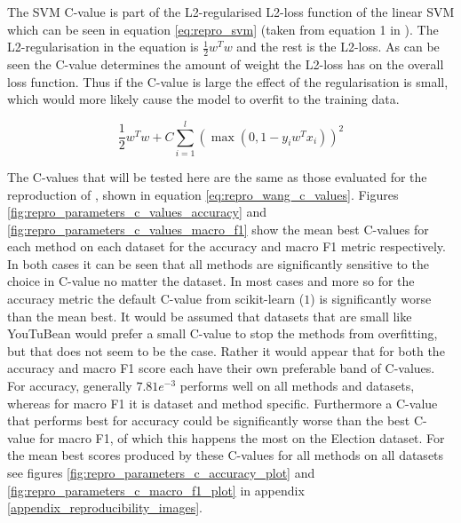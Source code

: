 The SVM C-value is part of the L2-regularised L2-loss function of the linear SVM which can be seen in equation \ref{eq:repro_svm} (taken from equation 1 in \citep{fan2008liblinear}). The L2-regularisation in the equation is $\frac{1}{2}w^Tw$ and the rest is the L2-loss. As can be seen the C-value determines the amount of weight the L2-loss has on the overall loss function. Thus if the C-value is large the effect of the regularisation is small, which would more likely cause the model to overfit to the training data.

\begin{equation}
    \frac{1}{2}w^{T}w + C\sum_{i=1}^{l}(\max(0, 1 - y_{i}w^{T}x_i))^2
    \label{eq:repro_svm}
\end{equation}

The C-values that will be tested here are the same as those evaluated for the reproduction of \citet{wang-etal-2017-tdparse}, shown in equation \ref{eq:repro_wang_c_values}. Figures \ref{fig:repro_parameters_c_values_accuracy} and \ref{fig:repro_parameters_c_values_macro_f1} show the mean best C-values for each method on each dataset for the accuracy and macro F1 metric respectively. In both cases it can be seen that all methods are significantly sensitive to the choice in C-value no matter the dataset. In most cases and more so for the accuracy metric the default C-value from scikit-learn \citep{pedregosa2011scikit} ($1$) is significantly worse than the mean best. It would be assumed that datasets that are small like YouTuBean would prefer a small C-value to stop the methods from overfitting, but that does not seem to be the case. Rather it would appear that for both the accuracy and macro F1 score each have their own preferable band of C-values. For accuracy, generally $7.81e^{-3}$ performs well on all methods and datasets, whereas for macro F1 it is dataset and method specific. Furthermore a C-value that performs best for accuracy could be significantly worse than the best C-value for macro F1, of which this happens the most on the Election dataset. For the mean best scores produced by these C-values for all methods on all datasets see figures \ref{fig:repro_parameters_c_accuracy_plot} and \ref{fig:repro_parameters_c_macro_f1_plot} in appendix \ref{appendix_reproducibility_images}.

